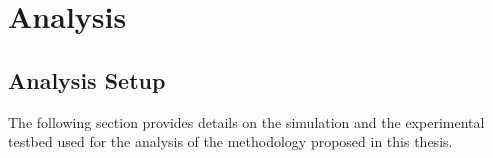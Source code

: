 \chapter{Analysis}\label{chap:analysis}



\section{Analysis Setup}
The following section provides details on the simulation and the experimental testbed used for the analysis of the methodology proposed in this thesis.

